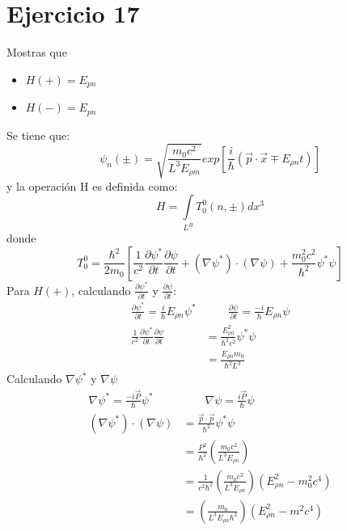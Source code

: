 \section*{Ejercicio 17}
Mostras que
\begin{itemize}
    \item $H(+)=E_{pn}$
    \item $H(-)=E_{pn}$
\end{itemize}
Se tiene que:
\begin{equation*}
    \psi_n (\pm) = \sqrt{\frac{m_0c^2}{L^3E_{\rho m}}} exp\left[\frac{i}{\hbar}\left(\vec{p}\cdot \vec{x}\mp E_{\rho n}t\right)\right]
\end{equation*}
y la operación H es definida como:
\begin{equation*}
    H=\int\limits_{L^B} T_0^0(n,\pm) dx^3
\end{equation*}
donde 
\begin{equation*}
    T_0^0 = \frac{\hbar^2}{2m_0} \left[\frac{1}{c^2} \frac{\partial \psi^*}{\partial t}\frac{\partial \psi}{\partial t}+ \left(\nabla \psi^*\right)\cdot \left(\nabla \psi \right)+ \frac{m_0^2c^2}{\hbar^2} \psi^* \psi \right]  
\end{equation*}
Para $H(+)$, calculando $ \frac{\partial \psi^*}{\partial t}$  y $ \frac{\partial \psi}{\partial t}$:
\begin{align*}
    \frac{\partial \psi^*}{\partial t} = \frac{i}{\hbar} E_{\rho n} \psi^* &\qquad  \frac{\partial \psi}{\partial t} = \frac{-i}{\hbar} E_{\rho n} \psi\\
    \frac{1}{c^2}  \frac{\partial \psi^*}{\partial t} \frac{\partial \psi}{\partial t} &= \frac{E_{\rho n}^2}{\hbar^2c^2} \psi^* \psi\\
    &= \frac{E_{\rho n}m_0}{\hbar^2 L^3}
\end{align*}
Calculando $\nabla \psi^*$ y $\nabla \psi$
\begin{align*}
    \nabla \psi^* = \frac{-i\vec{P}}{\hbar}\psi^* &\qquad \nabla \psi = \frac{i\vec{P}}{\hbar} \psi\\
    \left(\nabla \psi^*\right) \cdot \left(\nabla \psi\right) &=\frac{\vec{p}\cdot \vec{p}}{\hbar^2} \psi^* \psi \\
    &= \frac{P^2}{\hbar^2} \left(\frac{m_0c^2}{L^3 E_{\rho n}}\right)\\
    &= \frac{1}{c^2 \hbar^2} \left(\frac{m_0c^2}{L^3 E_{\rho n}}\right) (E_{\rho n}^2-m_0^2c^4)\\
    &= \left(\frac{m_0}{L^3 E_{\rho n }\hbar^2}\right) (E_{\rho n}^2-m^2c^4)
\end{align*}
